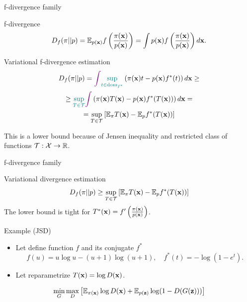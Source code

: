 \begin{frame}{f-divergence family}
	\vspace{-0.4cm}
	\begin{block}{f-divergence}
		\vspace{-0.3cm}
		\[
		D_f(\pi || p) = \mathbb{E}_{p(\mathbf{x})}  f\left( \frac{\pi(\mathbf{x})}{p(\mathbf{x})} \right)  = \int p(\mathbf{x}) f\left( \frac{\pi(\mathbf{x})}{p(\mathbf{x})} \right) d \mathbf{x}.
		\]
		\vspace{-0.4cm}
	\end{block}
	\begin{block}{Variational f-divergence estimation}
		\vspace{-0.8cm}
		\begin{multline*}
			D_f(\pi || p)  = {\color{violet}\int} {\color{teal} \sup_{t \in \text{dom}_{f^*}}} \left( \pi(\mathbf{x})t - p(\mathbf{x}) f^*(t) \right) d \mathbf{x} \geq \\
			 \geq {\color{teal}\sup_{T \in \mathcal{T}}} {\color{violet}\int} \left( \pi(\mathbf{x})T(\mathbf{x}) - p(\mathbf{x}) f^*(T(\mathbf{x})) \right) d \mathbf{x} = \\
			 = \sup_{T \in \mathcal{T}} \left[\mathbb{E}_{\pi}T(\mathbf{x}) -  \mathbb{E}_p f^*(T(\mathbf{x})) \right]
		\end{multline*}
	\vspace{-0.6cm}
	\end{block}
	This is a lower bound because of Jensen inequality and restricted class of functions $\mathcal{T}: \mathcal{X} \rightarrow \mathbb{R}$. 
	
\end{frame}
\begin{frame}{f-divergence family}
	\begin{block}{Variational divergence estimation}
		\[
			D_f(\pi || p) \geq \sup_{T \in \mathcal{T}} \left[\mathbb{E}_{\pi}T(\mathbf{x}) -  \mathbb{E}_p f^*(T(\mathbf{x})) \right]
		\]
		The lower bound is tight for $T^*(\mathbf{x}) = f'\left( \frac{\pi(\mathbf{x})}{p(\mathbf{x})} \right)$.
	\end{block}
	\begin{block}{Example (JSD)}
		\begin{itemize}
			\item Let define function $f$ and its conjugate $f^*$
			\[ 
				f(u) = u \log u - (u + 1) \log (u + 1), \quad f^*(t) = - \log (1 - e^t).
			\]
			\item Let reparametrize $T(\mathbf{x}) = \log D(\mathbf{x})$.
		\end{itemize}
		\vspace{-0.4cm}
	\end{block}
	\[
		\min_{G} \max_D \left[ \mathbb{E}_{\pi(\mathbf{x})} \log D(\mathbf{x}) + \mathbb{E}_{p(\mathbf{z})} \log (1 - D(G(\mathbf{z}))) \right]
	\]

\end{frame}
